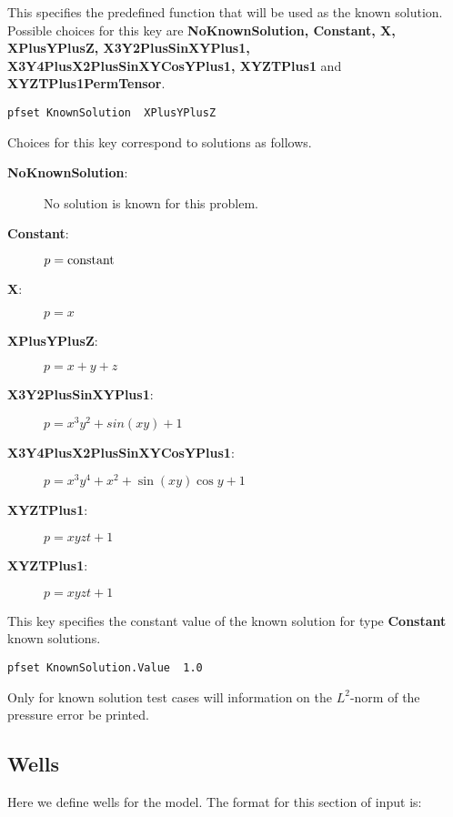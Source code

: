 {This specifies the predefined function that will be used as the known
solution.  Possible choices for this key are {\bf NoKnownSolution, Constant,
X, XPlusYPlusZ, X3Y2PlusSinXYPlus1, X3Y4PlusX2PlusSinXYCosYPlus1, XYZTPlus1}
and {\bf XYZTPlus1PermTensor}.
}
\begin{display}\begin{verbatim}
pfset KnownSolution  XPlusYPlusZ
\end{verbatim}\end{display}
Choices for this key correspond to solutions as follows.
\begin{description}
\item[{\bf NoKnownSolution}: ] No solution is known for this problem.
\item[{\bf Constant}: ] $p = {\rm constant}$
\item[{\bf X}: ] $p = x$
\item[{\bf XPlusYPlusZ}: ] $p = x + y + z$
\item[{\bf X3Y2PlusSinXYPlus1}: ] $p = x^3 y^2 + sin(xy) + 1$
\item[{\bf X3Y4PlusX2PlusSinXYCosYPlus1}: ]
$p = x^3 y^4 + x^2 + \sin(xy)\cos y + 1$
\item[{\bf XYZTPlus1}: ] $p = xyzt + 1$
\item[{\bf XYZTPlus1}: ] $p = xyzt + 1$
\end{description}

{This key specifies the constant value of the known solution for type
{\bf Constant} known solutions.
}
\begin{display}\begin{verbatim}
pfset KnownSolution.Value  1.0
\end{verbatim}\end{display}

Only for known solution test cases will information on the $L^2$-norm
of the pressure error be printed.


\subsection{Wells}
\label{Wells}

Here we define wells for the model.  The format for this section of
input is:

